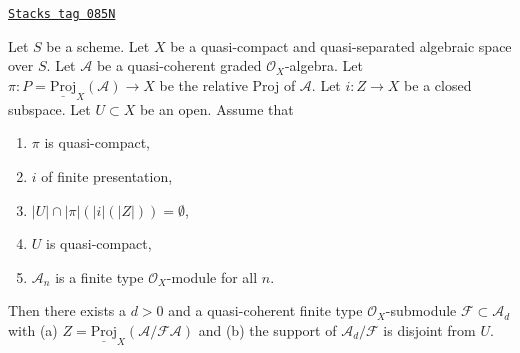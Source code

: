 \begin{lemma}
\label{spaces-divisors-lemma-closed-subscheme-proj-finite-type}
\href{https://stacks.math.columbia.edu/tag/085N}{\texttt{Stacks tag 085N}}

Let $S$ be a scheme. Let $X$ be a quasi-compact and quasi-separated
algebraic space over $S$.
Let $\mathcal{A}$ be a quasi-coherent graded $\mathcal{O}_X$-algebra.
Let $\pi : P = \underline{\text{Proj}}_X(\mathcal{A}) \to X$ be the relative
Proj of $\mathcal{A}$. Let $i : Z \to X$ be a closed subspace.
Let $U \subset X$ be an open. Assume that
\begin{enumerate}
\item $\pi$ is quasi-compact,
\item $i$ of finite presentation,
\item $|U| \cap |\pi|(|i|(|Z|)) = \emptyset$,
\item $U$ is quasi-compact,
\item $\mathcal{A}_n$ is a finite type $\mathcal{O}_X$-module for all $n$.
\end{enumerate}
Then there exists a $d > 0$ and a quasi-coherent finite type
$\mathcal{O}_X$-submodule $\mathcal{F} \subset \mathcal{A}_d$ with (a)
$Z = \underline{\text{Proj}}_X(\mathcal{A}/\mathcal{F}\mathcal{A})$
and (b) the support of $\mathcal{A}_d/\mathcal{F}$ is disjoint from $U$.
\end{lemma}

